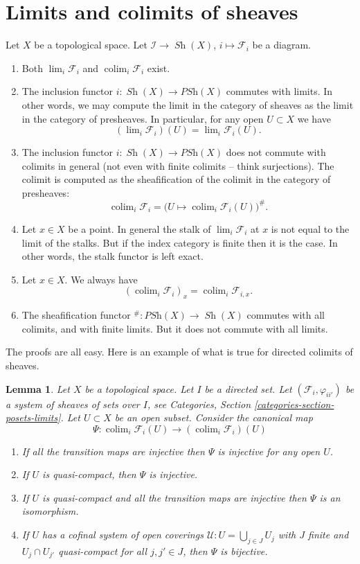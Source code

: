 \documentclass{stacks-project}
\theoremstyle{plain}
\newtheorem{lemma}[subsection]{Lemma}
\theoremstyle{definition}
\theoremstyle{remark}
\numberwithin{equation}{subsection}
\def\lim{\mathop{\mathrm{lim}}\nolimits}
\def\colim{\mathop{\mathrm{colim}}\nolimits}
\def\Sh{\mathop{\mathit{Sh}}\nolimits}
\begin{document}
\section{Limits and colimits of sheaves}
\label{section-limits-sheaves}

\noindent
Let $X$ be a topological space.
Let $\mathcal{I} \to \Sh(X)$, $i \mapsto \mathcal{F}_i$
be a diagram.
\begin{enumerate}
\item Both $\lim_i \mathcal{F}_i$ and $\colim_i \mathcal{F}_i$
exist.
\item The inclusion functor $i : \Sh(X) \to \textit{PSh}(X)$
commutes with limits. In other words, we may compute the limit
in the category of sheaves as the limit in the category of
presheaves. In particular, for any open $U \subset X$ we have
$$
(\lim_i \mathcal{F}_i)(U) = \lim_i \mathcal{F}_i(U).
$$
\item The inclusion functor $i : \Sh(X) \to \textit{PSh}(X)$
does not commute with colimits in general (not even
with finite colimits -- think surjections). The colimit is
computed as the sheafification of the colimit in the
category of presheaves:
$$
\colim_i \mathcal{F}_i =
\Big(U \mapsto \colim_i \mathcal{F}_i(U)\Big)^\#.
$$
\item Let $x \in X$ be a point. In general the stalk of
$\lim_i \mathcal{F}_i$ at $x$ is not equal to
the limit of the stalks. But if the index category is finite
then it is the case. In other words, the stalk functor is
left exact.
\item Let $x \in X$. We always have
$$
(\colim_i \mathcal{F}_i)_x = \colim_i \mathcal{F}_{i, x}.
$$
\item The sheafification functor
${}^\# : \textit{PSh}(X) \to \Sh(X)$ commutes with all
colimits, and with finite limits. But it does not commute
with all limits.
\end{enumerate}
The proofs are all easy. Here is an example of what is true for directed
colimits of sheaves.

\begin{lemma}
\label{lemma-directed-colimits-sections}
Let $X$ be a topological space. Let $I$ be a directed set.
Let $(\mathcal{F}_i, \varphi_{ii'})$ be a system of sheaves of sets
over $I$, see
Categories, Section \ref{categories-section-posets-limits}.
Let $U \subset X$ be an open subset.
Consider the canonical map
$$
\Psi :
\colim_i \mathcal{F}_i(U)
\longrightarrow
\left(\colim_i \mathcal{F}_i\right)(U)
$$
\begin{enumerate}
\item If all the transition maps are injective then
$\Psi$ is injective for any open $U$.
\item If $U$ is quasi-compact, then $\Psi$ is injective.
\item If $U$ is quasi-compact and all the transition maps are injective
then $\Psi$ is an isomorphism.
\item If $U$ has a cofinal system of open coverings
$\mathcal{U} : U = \bigcup_{j\in J} U_j$ with
$J$ finite and $U_j \cap U_{j'}$ quasi-compact
for all $j, j' \in J$, then $\Psi$ is bijective.
\end{enumerate}
\end{lemma}
\end{document}
